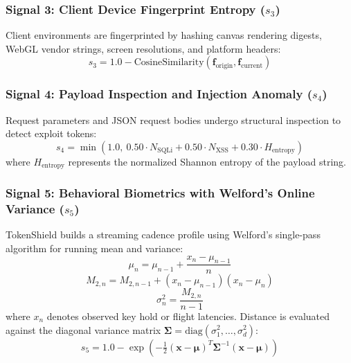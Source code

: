 \documentclass[conference]{IEEEtran}
\begin{document}
\subsubsection{Signal 3: Client Device Fingerprint Entropy ($s_3$)}
Client environments are fingerprinted by hashing canvas rendering digests, WebGL vendor strings, screen resolutions, and platform headers:
\begin{equation}
s_3 = 1.0 - \text{CosineSimilarity}(\mathbf{f}_{\text{origin}}, \mathbf{f}_{\text{current}})
\label{eq:sig3}
\end{equation}

\subsubsection{Signal 4: Payload Inspection and Injection Anomaly ($s_4$)}
Request parameters and JSON request bodies undergo structural inspection to detect exploit tokens:
\begin{equation}
s_4 = \min \left( 1.0, ~ 0.50 \cdot N_{\text{SQLi}} + 0.50 \cdot N_{\text{XSS}} + 0.30 \cdot H_{\text{entropy}} \right)
\label{eq:sig4}
\end{equation}
where $H_{\text{entropy}}$ represents the normalized Shannon entropy of the payload string.

\subsubsection{Signal 5: Behavioral Biometrics with Welford's Online Variance ($s_5$)}
TokenShield builds a streaming cadence profile using Welford's single-pass algorithm for running mean and variance:
\begin{equation}
\mu_n = \mu_{n-1} + \frac{x_n - \mu_{n-1}}{n}
\label{eq:sig5_mean}
\end{equation}
\begin{equation}
M_{2,n} = M_{2,n-1} + (x_n - \mu_{n-1})(x_n - \mu_n)
\label{eq:sig5_m2}
\end{equation}
\begin{equation}
\sigma_n^2 = \frac{M_{2,n}}{n - 1}
\label{eq:sig5_var}
\end{equation}
where $x_n$ denotes observed key hold or flight latencies. Distance is evaluated against the diagonal variance matrix $\mathbf{\Sigma} = \text{diag}(\sigma_1^2, \dots, \sigma_d^2)$:
\begin{equation}
s_5 = 1.0 - \exp\!\left(-\tfrac{1}{2}(\mathbf{x} - \boldsymbol{\mu})^T \mathbf{\Sigma}^{-1} (\mathbf{x} - \boldsymbol{\mu})\right)
\label{eq:sig5_dist}
\end{equation}
\end{document}
